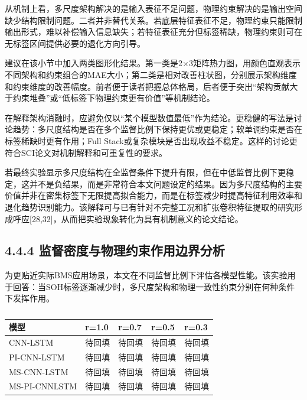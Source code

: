 \documentclass[12pt, a4paper]{ctexart}
\begin{document}
从机制上看，多尺度架构解决的是输入表征不足问题，物理约束解决的是输出空间缺少结构限制问题。二者并非替代关系。若底层特征表征不足，物理约束只能限制输出形式，难以补偿输入信息缺失；若特征表征充分但标签稀缺，物理约束则可在无标签区间提供必要的退化方向引导。


建议在该小节中加入两类图形化结果。第一类是2×3矩阵热力图，用颜色直观表示不同架构和约束组合的MAE大小；第二类是相对改善柱状图，分别展示架构维度和约束维度的改善幅度。前者便于读者把握总体格局，后者便于突出“架构贡献大于约束堆叠”或“低标签下物理约束更有价值”等机制结论。


在解释架构消融时，应避免仅以“某个模型数值最低”作为结论。更稳健的写法是讨论趋势：多尺度结构是否在多个监督比例下保持更优或更稳定；软单调约束是否在标签稀缺时更有作用；Full Stack或复杂模块是否出现收益不稳定。这样的讨论更符合SCI论文对机制解释和可重复性的要求。


若最终实验显示多尺度结构在全监督条件下提升有限，但在中低监督比例下更稳定，这并不是负结果，而是非常符合本文问题设定的结果。因为多尺度结构的主要价值并非在密集标签下无限提高拟合能力，而是在标签减少时提高特征利用效率和退化趋势识别能力。该解释可与已有针对不完整工况和扩张卷积特征提取的研究形成呼应[28,32]，从而把实验现象转化为具有机制意义的论文结论。



\subsection{4.4.4 监督密度与物理约束作用边界分析}

为更贴近实际BMS应用场景，本文在不同监督比例下评估各模型性能。该实验用于回答：当SOH标签逐渐减少时，多尺度架构和物理一致性约束分别在何种条件下发挥作用。




\begin{table}[H]
  \centering
  \begin{tabular}{lllll}
  \toprule
  模型 & r=1.0 & r=0.7 & r=0.5 & r=0.3 \\
  \midrule
  CNN-LSTM & 待回填 & 待回填 & 待回填 & 待回填 \\
  PI-CNN-LSTM & 待回填 & 待回填 & 待回填 & 待回填 \\
  MS-CNN-LSTM & 待回填 & 待回填 & 待回填 & 待回填 \\
  MS-PI-CNNLSTM & 待回填 & 待回填 & 待回填 & 待回填 \\
  \bottomrule
  \end{tabular}
  \caption{}
  \label{tab:}
\end{table}
\end{document}
